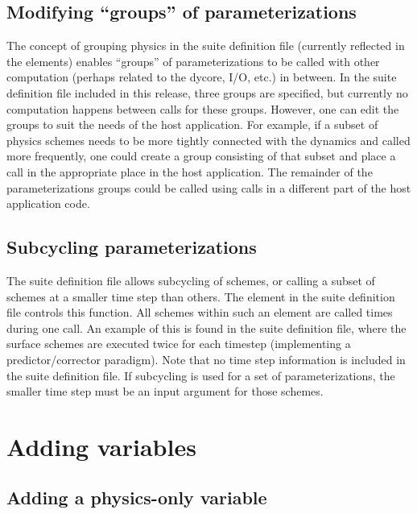 \subsection{Modifying ``groups'' of parameterizations}

The concept of grouping physics in the suite definition file (currently reflected in the  elements) enables ``groups'' of parameterizations to be called with other computation (perhaps related to the dycore, I/O, etc.) in between. In the suite definition file included in this release, three groups are specified, but currently no computation happens between  calls for these groups. However, one can edit the groups to suit the needs of the host application. For example, if a subset of physics schemes needs to be more tightly connected with the dynamics and called more frequently, one could create a group consisting of that subset and place a  call in the appropriate place in the host application. The remainder of the parameterizations groups could be called using  calls in a different part of the host application code.

\subsection{Subcycling parameterizations}

The suite definition file allows subcycling of schemes, or calling a subset of schemes at a smaller time step than others. The \execout{>} element in the suite definition file controls this function. All schemes within such an element are called  times during one  call. An example of this is found in the  suite definition file, where the surface schemes are executed twice for each timestep (implementing a predictor/corrector paradigm). Note that no time step information is included in the suite definition file. If subcycling is used for a set of parameterizations, the smaller time step must be an input argument for those schemes. 

\section{Adding variables}

\subsection{Adding a physics-only variable} \label{adding_physics_only_variable}

